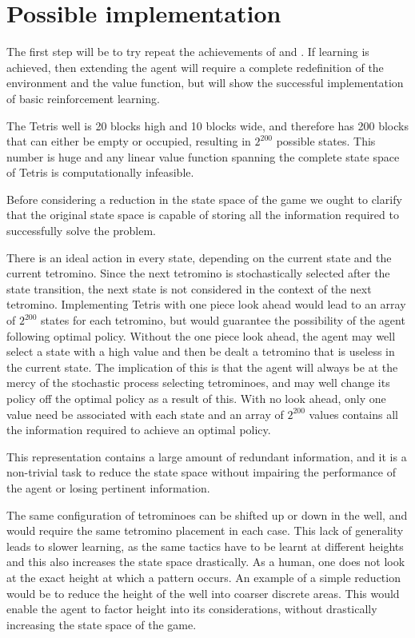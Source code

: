 \documentclass[a4paper]{article}%
\begin{document}
\section{Possible implementation}

The first step will be to try repeat the achievements of \cite{melaxtetris} and \cite{yaeltetris}. If learning is achieved, then extending the agent will require a complete redefinition of the environment and the value function, but will show the successful implementation of basic reinforcement learning.

The Tetris well is 20 blocks high and 10 blocks wide, and therefore has 200 blocks that can either be empty or occupied, resulting in $2^{200}$ possible states. This number is huge and any linear value function spanning the complete state space of Tetris is computationally infeasible\citep{tetrisconstraint}.

Before considering a reduction in the state space of the game we ought to clarify that the original state space is capable of storing all the information required to successfully solve the problem.  

There is an ideal action in every state, depending on the current state and the current tetromino. Since the next tetromino is stochastically selected after the state transition, the next state is not considered in the context of the next tetromino. Implementing Tetris with one piece look ahead would lead to an array of $2^{200}$ states for each tetromino, but would guarantee the possibility of the agent following optimal policy. Without the one piece look ahead, the agent may well select a state with a high value and then be dealt a tetromino that is useless in the current state. The implication of this is that the agent will always be at the mercy of the stochastic process selecting tetrominoes, and may well change its policy off the optimal policy as a result of this. With no look ahead, only one value need be associated with each state and  an array of $2^{200}$ values contains all the information required to achieve an optimal policy.

This representation contains a large amount of redundant information, and it is a non-trivial task to reduce the state space without impairing the performance of the agent or losing pertinent information. 

The same configuration of tetrominoes can be shifted up or down in the well, and would require the same tetromino placement in each case. This lack of generality leads to slower learning, as the same tactics have to be learnt at different heights and this also increases the state space drastically. As a human, one does not look at the exact height at which a pattern occurs. An example of a simple reduction would be to reduce the height of the well into coarser discrete areas. This would enable the agent to factor height into its considerations, without drastically increasing the state space of the game.
\end{document}

